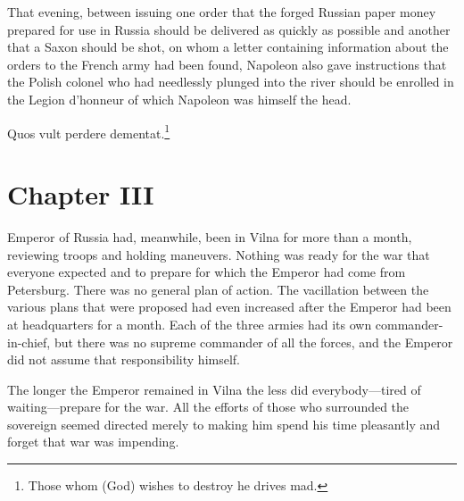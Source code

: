 That evening, between issuing one order that the forged Russian
paper money prepared for use in Russia should be delivered as
quickly as possible and another that a Saxon should be shot, on
whom a letter containing information about the orders to the
French army had been found, Napoleon also gave instructions that
the Polish colonel who had needlessly plunged into the river
should be enrolled in the Legion d'honneur of which Napoleon was
himself the head.

Quos vult perdere dementat.\footnote{Those whom (God) wishes to
destroy he drives mad.}


\chapter*{Chapter III} 
\ifaudio     
{} 
\fi

 Emperor of Russia had, meanwhile, been in Vilna for more than
a month, reviewing troops and holding maneuvers. Nothing was
ready for the war that everyone expected and to prepare for which
the Emperor had come from Petersburg. There was no general plan
of action. The vacillation between the various plans that were
proposed had even increased after the Emperor had been at
headquarters for a month. Each of the three armies had its own
commander-in-chief, but there was no supreme commander of all the
forces, and the Emperor did not assume that responsibility
himself.

The longer the Emperor remained in Vilna the less did
everybody---tired of waiting---prepare for the war. All the
efforts of those who surrounded the sovereign seemed directed
merely to making him spend his time pleasantly and forget that
war was impending.

